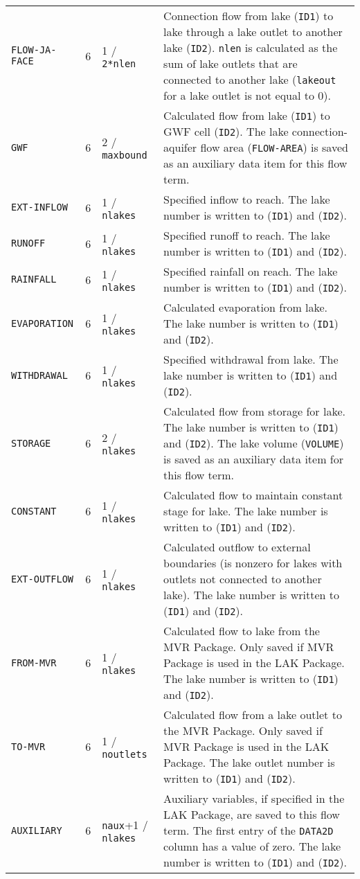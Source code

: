 \begin{longtable}{p{3.5cm} p{2cm} p{3.5cm} p{6.5cm}}
\texttt{FLOW-JA-FACE} & 6 & 1 / \texttt{2*nlen} & Connection flow from lake (\texttt{ID1}) to lake through a lake outlet to another lake (\texttt{ID2}). \texttt{nlen} is calculated as the sum of lake outlets that are connected to another lake (\texttt{lakeout} for a lake outlet is not equal to 0). \\
\texttt{GWF} & 6 & 2 / \texttt{maxbound} & Calculated flow from lake (\texttt{ID1}) to GWF cell (\texttt{ID2}). The lake connection-aquifer flow area (\texttt{FLOW-AREA}) is saved as an auxiliary data item for this flow term. \\
\texttt{EXT-INFLOW} & 6 & 1 / \texttt{nlakes} & Specified inflow to reach. The lake number is written to (\texttt{ID1}) and (\texttt{ID2}). \\
\texttt{RUNOFF} & 6 & 1 / \texttt{nlakes} & Specified runoff to reach. The lake number is written to (\texttt{ID1}) and (\texttt{ID2}). \\
\texttt{RAINFALL} & 6 & 1 / \texttt{nlakes} & Specified rainfall on reach. The lake number is written to (\texttt{ID1}) and (\texttt{ID2}). \\
\texttt{EVAPORATION} & 6 & 1 / \texttt{nlakes} & Calculated evaporation from lake. The lake number is written to (\texttt{ID1}) and (\texttt{ID2}). \\
\texttt{WITHDRAWAL} & 6 & 1 / \texttt{nlakes} & Specified withdrawal from lake. The lake number is written to (\texttt{ID1}) and (\texttt{ID2}). \\
\texttt{STORAGE} & 6 & 2 / \texttt{nlakes} & Calculated flow from storage for lake. The lake number is written to (\texttt{ID1}) and (\texttt{ID2}). The lake volume (\texttt{VOLUME}) is saved as an auxiliary data item for this flow term. \\
\texttt{CONSTANT} & 6 & 1 / \texttt{nlakes} & Calculated flow to maintain constant stage for lake. The lake number is written to (\texttt{ID1}) and (\texttt{ID2}). \\
\texttt{EXT-OUTFLOW} & 6 & 1 / \texttt{nlakes} & Calculated outflow to external boundaries (is nonzero for lakes with outlets not connected to another lake). The lake number is written to (\texttt{ID1}) and (\texttt{ID2}). \\
\texttt{FROM-MVR} & 6 & 1 / \texttt{nlakes} & Calculated flow to lake from the MVR Package. Only saved if MVR Package is used in the LAK Package. The lake number is written to (\texttt{ID1}) and (\texttt{ID2}). \\
\texttt{TO-MVR} & 6 & 1 / \texttt{noutlets} & Calculated flow from a lake outlet to the MVR Package. Only saved if MVR Package is used in the LAK Package. The lake outlet number is written to (\texttt{ID1}) and (\texttt{ID2}). \\
\texttt{AUXILIARY} & 6 & \texttt{naux}+1 / \texttt{nlakes} & Auxiliary variables, if specified in the LAK Package, are saved to this flow term. The first entry of the \texttt{DATA2D} column has a value of zero. The lake number is written to (\texttt{ID1}) and (\texttt{ID2}).
\label{table:binarylak}
\end{longtable}


